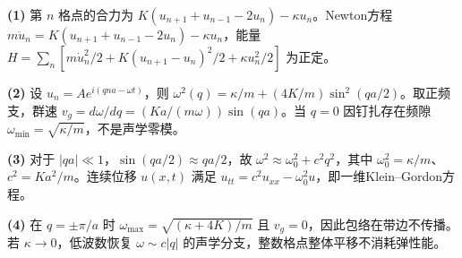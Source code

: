 \par\noindent\textbf{(1)} 第 \(n\) 格点的合力为 \(K(u_{n+1}+u_{n-1}-2u_n)-\kappa u_n\)。Newton方程 \(m\ddot u_n=K(u_{n+1}+u_{n-1}-2u_n)-\kappa u_n\)，能量 \(H=\sum_n[m\dot u_n^2/2+K(u_{n+1}-u_n)^2/2+\kappa u_n^2/2]\) 为正定。
\par\noindent\textbf{(2)} 设 \(u_n=Ae^{i(qna-\omega t)}\)，则 \(\omega^2(q)=\kappa/m+(4K/m)\sin^2(qa/2)\)。取正频支，群速 \(v_g=d\omega/dq=(Ka/(m\omega))\sin(qa)\)。当 \(q=0\) 因钉扎存在频隙 \(\omega_{\min}=\sqrt{\kappa/m}\)，不是声学零模。
\par\noindent\textbf{(3)} 对于 \(|qa|\ll1\)，\(\sin(qa/2)\approx qa/2\)，故 \(\omega^2\approx\omega_0^2+c^2q^2\)，其中 \(\omega_0^2=\kappa/m\)、\(c^2=Ka^2/m\)。连续位移 \(u(x,t)\) 满足 \(u_{tt}=c^2u_{xx}-\omega_0^2u\)，即一维Klein–Gordon方程。
\par\noindent\textbf{(4)} 在 \(q=\pm\pi/a\) 时 \(\omega_{\max}=\sqrt{(\kappa+4K)/m}\) 且 \(v_g=0\)，因此包络在带边不传播。若 \(\kappa\to0\)，低波数恢复 \(\omega\sim c|q|\) 的声学分支，整数格点整体平移不消耗弹性能。
